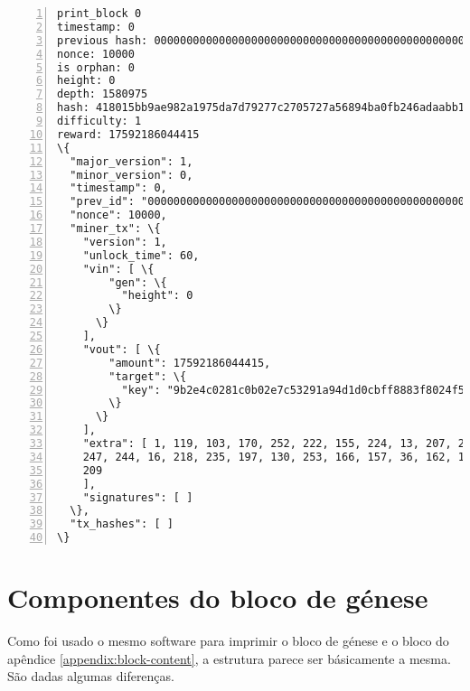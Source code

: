 \begin{Verbatim}[commandchars=\\\{\}, numbers=left]
print_block 0
timestamp: 0
previous hash: 0000000000000000000000000000000000000000000000000000000000000000
nonce: 10000
is orphan: 0
height: 0
depth: 1580975
hash: 418015bb9ae982a1975da7d79277c2705727a56894ba0fb246adaabb1f4632e3
difficulty: 1
reward: 17592186044415
\{
  "major_version": 1,
  "minor_version": 0,
  "timestamp": 0,
  "prev_id": "0000000000000000000000000000000000000000000000000000000000000000",
  "nonce": 10000,
  "miner_tx": \{
    "version": 1,
    "unlock_time": 60,
    "vin": [ \{
        "gen": \{
          "height": 0
        \}
      \}
    ],
    "vout": [ \{
        "amount": 17592186044415,
        "target": \{
          "key": "9b2e4c0281c0b02e7c53291a94d1d0cbff8883f8024f5142ee494ffbbd088071"
        \}
      \}
    ],
    "extra": [ 1, 119, 103, 170, 252, 222, 155, 224, 13, 207, 208, 152, 113, 94, 188, 
    247, 244, 16, 218, 235, 197, 130, 253, 166, 157, 36, 162, 142, 157, 11, 200, 144, 
    209
    ],
    "signatures": [ ]
  \},
  "tx_hashes": [ ]
\}
\end{Verbatim}



\section*{Componentes do bloco de génese}

Como foi usado o mesmo software para imprimir o bloco de génese e o bloco do apêndice \ref{appendix:block-content}, a estrutura parece ser básicamente a mesma. São dadas algumas diferenças.


